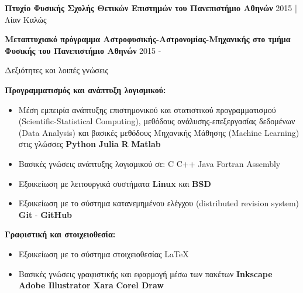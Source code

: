 \documentclass[a4paper,12pt,final]{memoir}
\newcommand{\SmallSep}{\vspace{0.25em}}
\newcommand{\CVSection}[1]
	{\Large{#1}\par
	\SmallSep\normalsize\normalfont}
\newcommand{\CVItem}[2]
	{\textbf{\color{RoyalBlue} #1} #2}
\newcommand{\location}[1]{ %
\small{\color{headings}#1}}
\newenvironment{tightitemize} %
{\vspace{-\topsep}\begin{itemize}\itemsep1pt \parskip0pt \parsep0pt}
{\end{itemize}\vspace{-\topsep}}
\begin{document}
\CVItem{Πτυχίο Φυσικής Σχολής Θετικών Επιστημών του Πανεπιστήμιο Αθηνών}{\newline}
\location{2015 | Λίαν Καλώς}
\SmallSep

\CVItem{Μεταπτυχιακό πρόγραμμα Αστροφυσικής-Αστρονομίας-Μηχανικής στο τμήμα Φυσικής του Πανεπιστήμιο Αθηνών }{\newline}
\location{2015 -}
\SmallSep



\CVSection{Δεξιότητες και λοιπές γνώσεις}
\CVItem{Προγραμματισμός και ανάπτυξη λογισμικού:}{}
\begin{tightitemize}
\item Μέση εμπειρία ανάπτυξης επιστημονικού και στατιστικού προγραμματισμού (Scientific-Statistical Computing), μεθόδους ανάλυσης-επεξεργασίας δεδομένων (Data Analysis) και βασικές μεθόδους Μηχανικής Μάθησης (Machine Learning) στις γλώσσες \textbf{Python} \textbullet{} \textbf{Julia} \textbullet{} \textbf{R} \textbullet{} \textbf{Matlab}
\item Βασικές γνώσεις ανάπτυξης λογισμικού σε: C \textbullet{} C++ \textbullet{} Java \textbullet{} Fortran \textbullet{} Assembly 
\item Εξοικείωση με λειτουργικά συστήματα \textbf{Linux} και \textbf{BSD}
\item Εξοικείωση με το σύστημα κατανεμημένου ελέγχου (distributed revision system) \textbf{Git} - \textbf{GitHub}
\end{tightitemize}

\CVItem{Γραφιστική και στοιχειοθεσία:}{}
\begin{tightitemize}
\item Εξοικείωση με το σύστημα στοιχειοθεσίας \LaTeX\
\item Βασικές γνώσεις γραφιστικής και εφαρμογή μέσω των πακέτων \textbf{Inkscape} \textbullet{} \textbf{Adobe Illustrator} \textbullet{} \textbf{Xara} \textbullet{} \textbf{Corel Draw}
\end{tightitemize}
\SmallSep
\end{document}
